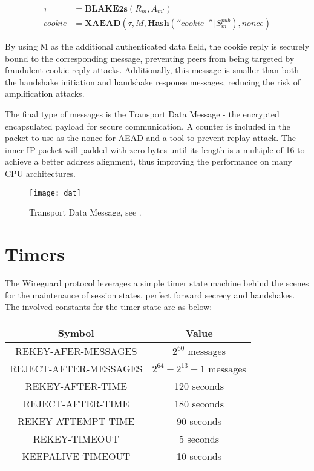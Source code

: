     \begin{align*}
      \tau &= \textbf{BLAKE2s}(R_m, A_{m'}) \\
      cookie &= \textbf{XAEAD}(\tau, M, \textbf{Hash}(''cookie\texttt{--}'' \Vert S^{pub}_m), nonce)
    \end{align*}

    By using M as the additional authenticated data field, the cookie reply is securely bound 
    to the corresponding message, preventing peers from being targeted by fraudulent cookie 
    reply attacks. Additionally, this message is smaller than both the handshake initiation and 
    handshake response messages, reducing the risk of amplification attacks.

    The final type of messages is the Transport Data Message - the encrypted encapsulated payload
    for secure communication. A counter is included in the packet to use as the nonce for AEAD
    and a tool to prevent replay attack. The inner IP packet will padded with zero bytes until
    its length is a multiple of 16 to achieve a better address alignment, thus improving the
    performance on many CPU architectures.

    \begin{figure}[h]
      \centering
      \texttt{[image: dat]}
      \caption{Transport Data Message, see \cite[p.~12]{wireguard}.}
      \label{fig:transdata}
    \end{figure} 


\section{Timers} \label{w4}
The Wireguard protocol leverages a simple timer state machine behind the scenes for the 
maintenance of session states, perfect forward secrecy and handshakes. The involved constants
for the timer state are as below:

\begin{center}
  \begin{tabular}{|c | c|} 
   \hline
   Symbol & Value \\
   \hline\hline
   \uppercase{Rekey-Afer-Messages} & $2^{60}$ messages \\ 
   \hline
   \uppercase{Reject-After-Messages} & $2^{64} - 2^{13} - 1$ messages \\
   \hline
   \uppercase{REKEY-AFTER-TIME} & 120 seconds \\
   \hline
   \uppercase{reject-after-time} & 180 seconds \\
   \hline
   \uppercase{rekey-attempt-time} & 90 seconds \\
   \hline
   \uppercase{rekey-timeout} & 5 seconds \\
   \hline
   \uppercase{keepalive-timeout} & 10 seconds \\
   \hline
  \end{tabular}
  \end{center}

